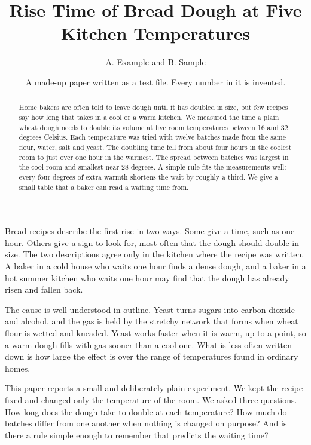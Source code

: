 \documentclass[twocolumn]{article}
\title{Rise Time of Bread Dough at Five Kitchen Temperatures}
\author{A. Example and B. Sample}
\date{A made-up paper written as a test file. Every number in it is invented.}
\makeatletter
\renewcommand\section{\@startsection{section}{1}{\z@}{-\baselineskip}{\baselineskip}{\normalfont\normalsize\bfseries}}
\makeatother
\begin{document}
\maketitle

\begin{abstract}
Home bakers are often told to leave dough until it has doubled in size, but few recipes say how long that takes in a cool or a warm kitchen. We measured the time a plain wheat dough needs to double its volume at five room temperatures between 16 and 32 degrees Celsius. Each temperature was tried with twelve batches made from the same flour, water, salt and yeast. The doubling time fell from about four hours in the coolest room to just over one hour in the warmest. The spread between batches was largest in the cool room and smallest near 28 degrees. A simple rule fits the measurements well: every four degrees of extra warmth shortens the wait by roughly a third. We give a small table that a baker can read a waiting time from.
\end{abstract}

\section{Introduction}

Bread recipes describe the first rise in two ways. Some give a time, such as one hour. Others give a sign to look for, most often that the dough should double in size. The two descriptions agree only in the kitchen where the recipe was written. A baker in a cold house who waits one hour finds a dense dough, and a baker in a hot summer kitchen who waits one hour may find that the dough has already risen and fallen back.

The cause is well understood in outline. Yeast turns sugars into carbon dioxide and alcohol, and the gas is held by the stretchy network that forms when wheat flour is wetted and kneaded. Yeast works faster when it is warm, up to a point, so a warm dough fills with gas sooner than a cool one. What is less often written down is how large the effect is over the range of temperatures found in ordinary homes.

This paper reports a small and deliberately plain experiment. We kept the recipe fixed and changed only the temperature of the room. We asked three questions. How long does the dough take to double at each temperature? How much do batches differ from one another when nothing is changed on purpose? And is there a rule simple enough to remember that predicts the waiting time?
\end{document}
